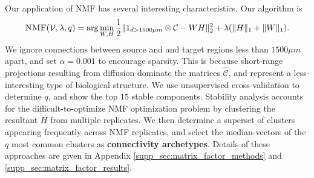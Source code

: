 Our application of NMF has several interesting characteristics.
Our algorithm is 
\begin{eqnarray*}
\label{eq:nmf}
\textsc{NMF}(\mathcal V, \lambda, q) = \arg \min_{W, H} \frac{1}{2}\| 1_{d > 1500 \mu m} \otimes \mathcal C - WH\|_2^2  + \lambda  (\|H \|_1 + \|W \|_1) .
\end{eqnarray*}
We ignore connections between source and and target regions less than $1500 \mu m$ apart, and set $\alpha = 0.001$ to encourage sparsity.
This is because short-range projections resulting from diffusion dominate the matrices $\hat {\mathcal C}$, and represent a less-interesting type of biological structure.
We use unsupervised cross-validation to determine $q$, and show the top $15$ stable components.
Stability analysis accounts for the difficult-to-optimize NMF optimization problem by clustering the resultant $H$ from  multiple replicates.
We then determine a superset of clusters appearing frequently across NMF replicates, and select the median-vectors of the $q$ most common clusters as \textbf{connectivity archetypes}.
Details of these approaches are given in Appendix \ref{supp_sec:matrix_factor_methods} and \ref{supp_sec:matrix_factor_results}.




